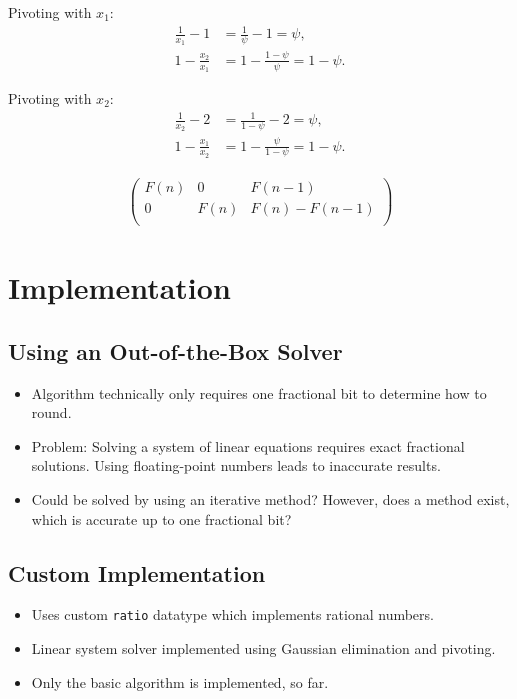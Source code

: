\documentclass[english,version-2020-11]{uzl-thesis}
\begin{document}
Pivoting with $x_1$:
\begin{align*}
  \frac{1}{x_1} - 1 & = \frac{1}{\psi} - 1 = \psi, \\
  1 - \frac{x_2}{x_1} & = 1 - \frac{1 - \psi}{\psi} = 1 - \psi.
\end{align*}

Pivoting with $x_2$:
\begin{align*}
  \frac{1}{x_2} - 2 & = \frac{1}{1 - \psi} - 2 = \psi, \\
  1 - \frac{x_1}{x_2} & = 1 - \frac{\psi}{1 - \psi} = 1 - \psi.
\end{align*}

\begin{align*}
  \left(
  \begin{array}{cc|c}
    F(n) & 0    & F(n-1) \\
    0    & F(n) & F(n) - F(n-1) \\
  \end{array}
  \right)
\end{align*}

\chapter{Implementation}

\section{Using an Out-of-the-Box Solver}

\begin{itemize}
  \item Algorithm technically only requires one fractional bit to determine how to round.
  \item Problem: Solving a system of linear equations requires exact fractional solutions.
    Using floating-point numbers leads to inaccurate results.
  \item Could be solved by using an iterative method? However, does a method
    exist, which is accurate up to one fractional bit?
\end{itemize}

\section{Custom Implementation}

\begin{itemize}
  \item Uses custom \texttt{ratio} datatype which implements rational numbers.
  \item Linear system solver implemented using Gaussian elimination and pivoting.
  \item Only the basic algorithm is implemented, so far.
\end{itemize}

\begin{bibtex-entries}
\end{bibtex-entries}
\end{document}
